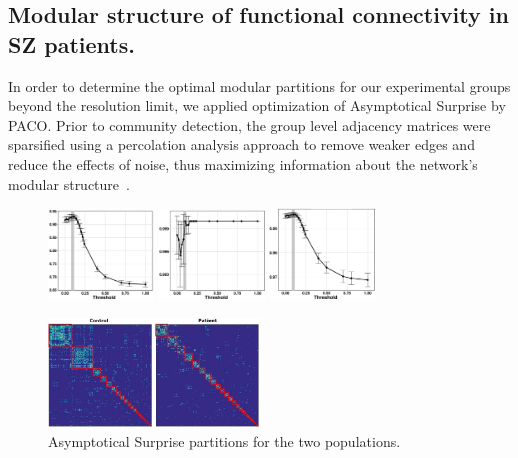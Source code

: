 \subsection{Modular structure of functional connectivity in SZ patients.}
In order to determine the optimal modular partitions for our experimental groups beyond the resolution limit, we applied optimization of Asymptotical Surprise by PACO.
Prior to community detection, the group level adjacency matrices were sparsified using a percolation analysis approach to remove weaker edges and reduce the effects of noise, thus maximizing information about the network's modular structure~\cite{nicolini2017,bardella2016a,gallos2012}.

\begin{figure}
\centering
\includegraphics[width=0.25\textwidth]{images/schizo/schizo_fig_3a.png}
\includegraphics[width=0.25\textwidth]{images/schizo/schizo_fig_3b.png}
\includegraphics[width=0.25\textwidth]{images/schizo/schizo_fig_3c.png}
\caption{}
\label{fig:schizo_percolation}
\end{figure}

\begin{figure}
\centering
\includegraphics[width=0.5\textwidth]{images/schizo/schizo_fig_3.jpg}
\caption{Asymptotical Surprise partitions for the two populations.}
\label{fig:schizo_control_patients}
\end{figure}

